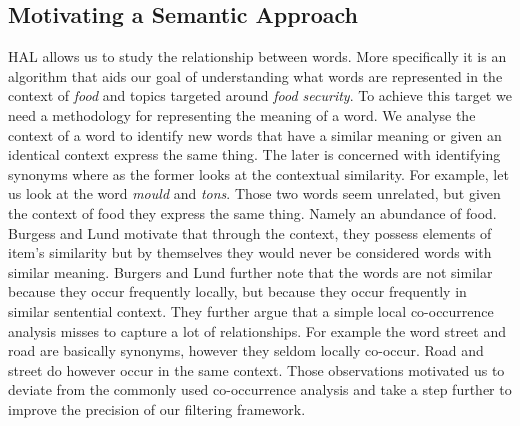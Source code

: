 \subsection{Motivating a Semantic Approach}
\label{subsec:hal}

HAL allows us to study the relationship between words. More specifically it is an algorithm that aids our goal of understanding what words are represented in the context of \emph{food} and topics targeted around \emph{food security}. To achieve this target we need a methodology for representing the meaning of a word. We analyse the context of a word to identify new words that have a similar meaning or given an identical context express the same thing. The later is concerned with identifying synonyms where as the former looks at the contextual similarity. For example, let us look at the word \emph {mould} and \emph {tons}. Those two words seem unrelated, but given the context of food they express the same thing.  Namely an abundance of food. Burgess and Lund \cite{burgess98} motivate that through the context,  they possess elements of item's similarity but by themselves they would never be considered words with similar meaning. Burgers and Lund further note that the words are not similar because they occur frequently locally, but because they occur frequently in similar sentential context. They further argue  that a simple local co-occurrence analysis misses to capture a lot of relationships. For example the word street and road are basically synonyms, however they seldom locally co-occur. Road and street do however occur in the same context. Those observations motivated us to deviate from the commonly used co-occurrence analysis and take a step further to improve the precision of our filtering framework. 




